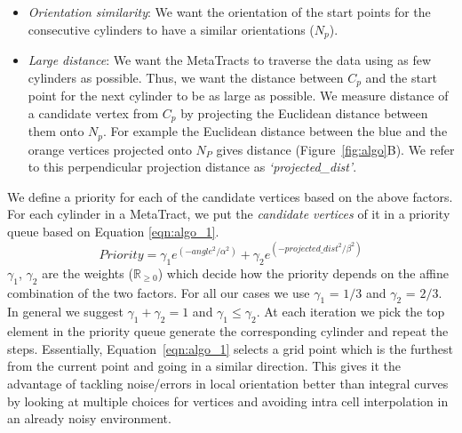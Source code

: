 \begin{itemize}
\item \textit{Orientation similarity}: We want the orientation of the start points for the consecutive cylinders to have a similar orientations ($N_p$). 
\item \textit{Large distance}: We want the MetaTracts to traverse the data using as few cylinders as possible. Thus, we want the distance between $C_p$ and the start point for the next cylinder to be as large as possible. We measure distance of a candidate vertex from $C_p$ by projecting the Euclidean distance between them onto $N_p$. For example the Euclidean distance between the blue and the orange vertices projected onto $N_P$ gives distance (Figure~\ref{fig:algo}B). We refer to this perpendicular projection distance as \textit{`projected\_dist'}. 

\end{itemize}
We define a priority for each of the candidate vertices based on the above factors.
For each cylinder in a MetaTract, we put the \textit{candidate vertices} of it in a priority queue based on Equation \ref{eqn:algo_1}.
\begin{equation}
Priority = \gamma_1 e^{(-angle^2 / \alpha^2)} + \gamma_2e^{(-projected\_dist^2 / \beta^2)}
\label{eqn:algo_1}
\end{equation}
$\gamma_1$, $\gamma_2$ are the  weights ($\mathbb{R}_{\ge 0}$)  which decide how the priority depends on the affine combination of the two factors. For all our cases we use $\gamma_1$ = $1 / 3 $ and $\gamma_2$ = $2 / 3$. In general we suggest $\gamma_1 +\gamma_2 = 1 $ and $\gamma_1 \leq \gamma_2$. At each iteration we pick the top element in the priority queue generate the corresponding cylinder and repeat the steps. Essentially, Equation~\ref{eqn:algo_1} selects a grid point which is the furthest from the current point and going in a similar direction. This gives it the advantage of tackling noise/errors in local orientation better than integral curves by looking at multiple choices for vertices and avoiding intra cell interpolation in an already noisy environment. 
 
